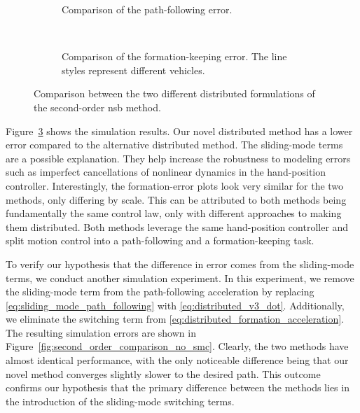 \begin{figure}[hb]
    \centering
    \begin{subfigure}[t]{.9\textwidth}
    \centering
    \setlength{}
    \setlength\figureheight{3cm}
    
    \caption{Comparison of the path-following error.}
    \label{fig:second_order_comparison_path}
    \end{subfigure}
    \\
    \begin{subfigure}[t]{.9\textwidth}
    \centering
    \setlength{}
    \setlength\figureheight{3cm}
    
    \caption{Comparison of the formation-keeping error. The line styles represent different vehicles.}
    \label{fig:second_order_comparison_formation}
    \end{subfigure}
    \caption{Comparison between the two different distributed formulations of the second-order \gls{nsb} method.}
    \label{fig:second_order_comparison}
\end{figure}

Figure~\ref{fig:second_order_comparison} shows the simulation results. Our novel distributed method has a lower error compared to the alternative distributed method. The sliding-mode terms are a possible explanation. They help increase the robustness to modeling errors such as imperfect cancellations of nonlinear dynamics in the hand-position controller. Interestingly, the formation-error plots look very similar for the two methods, only differing by scale. This can be attributed to both methods being fundamentally the same control law, only with different approaches to making them distributed. Both methods leverage the same hand-position controller and split motion control into a path-following and a formation-keeping task.

To verify our hypothesis that the difference in error comes from the sliding-mode terms, we conduct another simulation experiment. In this experiment, we remove the sliding-mode term from the path-following acceleration by replacing \eqref{eq:sliding_mode_path_following} with \eqref{eq:distributed_v3_dot}.  Additionally, we eliminate the switching term from \eqref{eq:distributed_formation_acceleration}. The resulting simulation errors are shown in Figure~\ref{fig:second_order_comparison_no_smc}. Clearly, the two methods have almost identical performance, with the only noticeable difference being that our novel method converges slightly slower to the desired path. This outcome confirms our hypothesis that the primary difference between the methods lies in the introduction of the sliding-mode switching terms.

